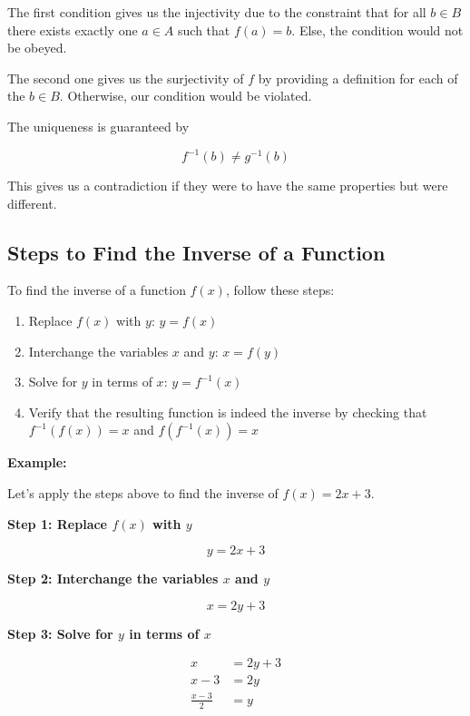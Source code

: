 The first condition gives us the injectivity due to the constraint that for all \(b \in B\) there exists exactly one \(a \in A\)
such that \(f(a) = b\). Else, the condition would not be obeyed.

The second one gives us the surjectivity of \(f\) by providing a definition for each of the \(b \in B\). Otherwise, 
our condition would be violated. 

The uniqueness is guaranteed by 

\[
	f^{-1}(b) \ne g^{-1}(b)
\]

This gives us a contradiction if they were to have the same properties but were different.

\QED

\subsection{Steps to Find the Inverse of a Function}

To find the inverse of a function \(f (x)\), follow these steps:

\begin{enumerate}
	
	\item Replace \(f (x)\) with \(y\): \(y = f (x)\)
	
	\item Interchange the variables \(x\) and \(y\): \(x = f (y)\)
	
	\item Solve for \(y\) in terms of \(x\): \(y = f^{-1} (x)\)
	
	\item Verify that the resulting function is indeed the inverse by checking that \(f^{-1}(f(x)) = x\) 
		  and \(f (f^{-1} (x)) = x\)

\end{enumerate}

\textbf{Example:}

Let's apply the steps above to find the inverse of \(f (x) = 2x + 3\).

\textbf{Step 1: Replace \(f(x)\) with \(y\)}

\[
	y = 2x + 3
\]

\textbf{Step 2: Interchange the variables \(x\) and \(y\)}

\[
	x = 2y + 3
\]

\textbf{Step 3: Solve for \(y\) in terms of \(x\)}

\begin{align*}
	x               & = 2y + 3 \\
	x - 3           & = 2y     \\
	\frac{x - 3}{2} & = y
\end{align*}

